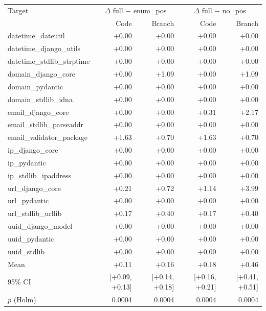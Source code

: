 \begin{tabular}{lrrrr}
\toprule
Target & \multicolumn{2}{c}{$\Delta$ full $-$ enum\_pos} & \multicolumn{2}{c}{$\Delta$ full $-$ no\_pos} \\
 & Code & Branch & Code & Branch \\
\midrule
datetime\_dateutil & +0.00 & +0.00 & +0.00 & +0.00 \\
datetime\_django\_utils & +0.00 & +0.00 & +0.00 & +0.00 \\
datetime\_stdlib\_strptime & +0.00 & +0.00 & +0.00 & +0.00 \\
domain\_django\_core & +0.00 & +1.09 & +0.00 & +1.09 \\
domain\_pydantic & +0.00 & +0.00 & +0.00 & +0.00 \\
domain\_stdlib\_idna & +0.00 & +0.00 & +0.00 & +0.00 \\
email\_django\_core & +0.00 & +0.00 & +0.31 & +2.17 \\
email\_stdlib\_parseaddr & +0.00 & +0.00 & +0.00 & +0.00 \\
email\_validator\_package & +1.63 & +0.70 & +1.63 & +0.70 \\
ip\_django\_core & +0.00 & +0.00 & +0.00 & +0.00 \\
ip\_pydantic & +0.00 & +0.00 & +0.00 & +0.00 \\
ip\_stdlib\_ipaddress & +0.00 & +0.00 & +0.00 & +0.00 \\
url\_django\_core & +0.21 & +0.72 & +1.14 & +3.99 \\
url\_pydantic & +0.00 & +0.00 & +0.00 & +0.00 \\
url\_stdlib\_urllib & +0.17 & +0.40 & +0.17 & +0.40 \\
uuid\_django\_model & +0.00 & +0.00 & +0.00 & +0.00 \\
uuid\_pydantic & +0.00 & +0.00 & +0.00 & +0.00 \\
uuid\_stdlib & +0.00 & +0.00 & +0.00 & +0.00 \\
\midrule
Mean & +0.11 & +0.16 & +0.18 & +0.46 \\
95\% CI & [+0.09, +0.13] & [+0.14, +0.18] & [+0.16, +0.21] & [+0.41, +0.51] \\
$p$ (Holm) & 0.0004 & 0.0004 & 0.0004 & 0.0004 \\
\bottomrule
\end{tabular}

